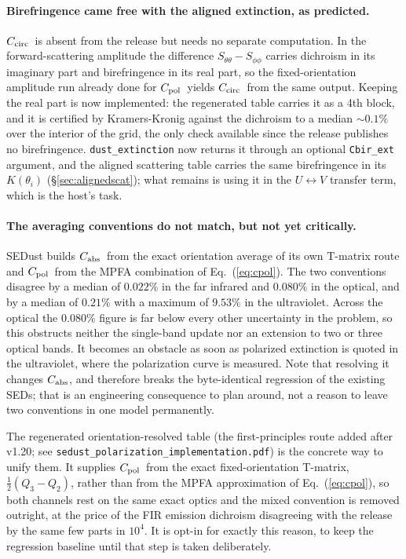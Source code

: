 \documentclass{my_memo}
\newcommand{\code}[1]{\texttt{#1}}
\newcommand{\Cabs}{\ensuremath{C_{\rm abs}}}
\newcommand{\Cpol}{\ensuremath{C_{\rm pol}}}
\newcommand{\Ccirc}{\ensuremath{C_{\rm circ}}}
\begin{document}
\paragraph{Birefringence came free with the aligned extinction, as
predicted.} \Ccirc\ is absent from the release but needs no separate
computation. In the forward-scattering amplitude the difference
$S_{\theta\theta} - S_{\phi\phi}$ carries dichroism in its imaginary part
and birefringence in its real part, so the fixed-orientation amplitude run
already done for \Cpol\ yields \Ccirc\ from the same output. Keeping the
real part is now implemented: the regenerated table carries it as a 4th
block, and it is certified by Kramers-Kronig against the dichroism to a
median $\sim0.1\%$ over the interior of the grid, the only check available
since the release publishes no birefringence. \code{dust\_extinction} now
returns it through an optional \code{Cbir\_ext} argument, and the aligned
scattering table carries the same birefringence in its $K(\theta_i)$
(\S\ref{sec:alignedscat}); what remains is using it in the
$U\leftrightarrow V$ transfer term, which is the host's task.

\paragraph{The averaging conventions do not match, but not yet
critically.} SEDust builds \Cabs\ from the exact orientation average of
its own T-matrix route and \Cpol\ from the MPFA combination of
Eq.~(\ref{eq:cpol}). The two conventions disagree by a median of
$0.022\%$ in the far infrared and $0.080\%$ in the optical, and by a
median of $0.21\%$ with a maximum of $9.53\%$ in the ultraviolet. Across
the optical the $0.080\%$ figure is far below every other uncertainty in
the problem, so this obstructs neither the single-band update nor an
extension to two or three optical bands. It becomes an obstacle as soon
as polarized extinction is quoted in the ultraviolet, where the
polarization curve is measured. Note that
resolving it changes \Cabs, and therefore breaks the byte-identical
regression of the existing SEDs; that is an engineering consequence to
plan around, not a reason to leave two conventions in one model
permanently.

The regenerated orientation-resolved table (the first-principles route added
after v1.20; see \code{sedust\_polarization\_implementation.pdf}) is the concrete
way to unify them. It supplies \Cpol\ from the exact fixed-orientation T-matrix,
$\tfrac12(Q_3-Q_2)$, rather than from the MPFA approximation of
Eq.~(\ref{eq:cpol}), so both channels rest on the same exact optics and the mixed
convention is removed outright, at the price of the FIR emission dichroism
disagreeing with the release by the same few parts in $10^4$. It is opt-in for
exactly this reason, to keep the regression baseline until that step is taken
deliberately.
\end{document}
